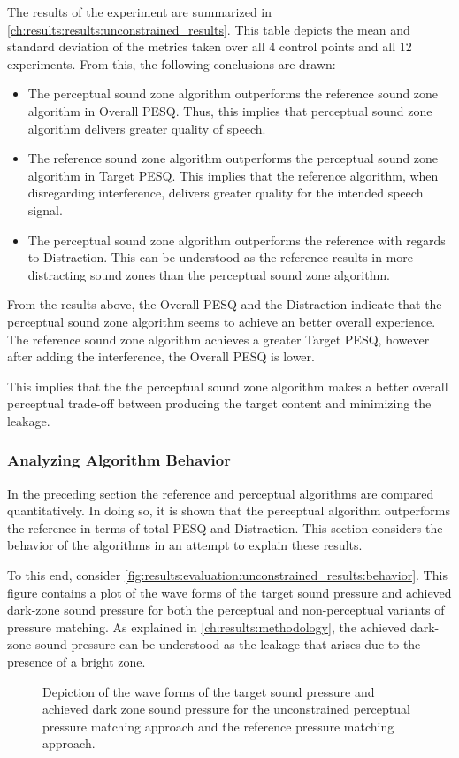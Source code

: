 The results of the experiment are summarized in \autoref{ch:results:results:unconstrained_results}.
This table depicts the mean and standard deviation of the metrics taken over all 4 control points and all 12 experiments.
From this, the following conclusions are drawn:
\begin{itemize}
    \item The perceptual sound zone algorithm outperforms the reference sound zone algorithm in Overall PESQ.
        Thus, this implies that perceptual sound zone algorithm delivers greater quality of speech.
    \item The reference sound zone algorithm outperforms the perceptual sound zone algorithm in Target PESQ.
        This implies that the reference algorithm, when disregarding interference, delivers greater quality for the intended speech signal.
    \item The perceptual sound zone algorithm outperforms the reference with regards to Distraction.
        This can be understood as the reference results in more distracting sound zones than the perceptual sound zone algorithm.
\end{itemize}
From the results above, the Overall PESQ and the Distraction indicate that the perceptual sound zone algorithm seems to 
achieve an better overall experience.
The reference sound zone algorithm achieves a greater Target PESQ, however after adding the interference, the Overall PESQ is lower.

This implies that the the perceptual sound zone algorithm makes a better overall perceptual trade-off between producing the target content 
and minimizing the leakage.

\subsubsection*{Analyzing Algorithm Behavior}
In the preceding section the reference and perceptual algorithms are compared quantitatively.
In doing so, it is shown that the perceptual algorithm outperforms the reference in terms of total PESQ and Distraction.
This section considers the behavior of the algorithms in an attempt to explain these results.

To this end, consider \autoref{fig:results:evaluation:unconstrained_results:behavior}.
This figure contains a plot of the wave forms of the target sound pressure and achieved dark-zone sound pressure for both the perceptual and non-perceptual
variants of pressure matching.
As explained in \autoref{ch:results:methodology}, the achieved dark-zone sound pressure can be understood as the leakage that arises due to the presence of a 
bright zone.
\begin{figure}[]

\caption{Depiction of the wave forms of the target sound pressure and achieved dark zone sound pressure for the 
    unconstrained perceptual pressure matching approach and the reference pressure matching approach.}
    \label{fig:results:evaluation:unconstrained_results:behavior}
\end{figure}


